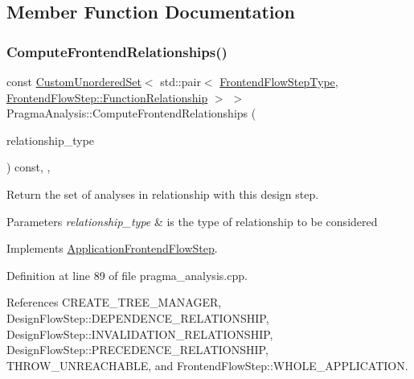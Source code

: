 \subsection{Member Function Documentation}
\mbox{\label{classPragmaAnalysis_a6c0e611acb6414cc71f044fc9ad2e715}} 
\subsubsection{\texorpdfstring{Compute\+Frontend\+Relationships()}{ComputeFrontendRelationships()}}
{\footnotesize\ttfamily const \hyperlink{classCustomUnorderedSet}{Custom\+Unordered\+Set}$<$ std\+::pair$<$ \hyperlink{frontend__flow__step_8hpp_afeb3716c693d2b2e4ed3e6d04c3b63bb}{Frontend\+Flow\+Step\+Type}, \hyperlink{classFrontendFlowStep_af7cf30f2023e5b99e637dc2058289ab0}{Frontend\+Flow\+Step\+::\+Function\+Relationship} $>$ $>$ Pragma\+Analysis\+::\+Compute\+Frontend\+Relationships (\begin{DoxyParamCaption}\item[{const \hyperlink{classDesignFlowStep_a723a3baf19ff2ceb77bc13e099d0b1b7}{Design\+Flow\+Step\+::\+Relationship\+Type}}]{relationship\+\_\+type }\end{DoxyParamCaption}) const\hspace{0.3cm}{\ttfamily [override]}, {\ttfamily [private]}, {\ttfamily [virtual]}}



Return the set of analyses in relationship with this design step. 


\begin{DoxyParams}{Parameters}
{\em relationship\+\_\+type} & is the type of relationship to be considered \\
\hline
\end{DoxyParams}


Implements \hyperlink{classApplicationFrontendFlowStep_ab308200c0096ccff3a1ff50e864ed61f}{Application\+Frontend\+Flow\+Step}.



Definition at line 89 of file pragma\+\_\+analysis.\+cpp.



References C\+R\+E\+A\+T\+E\+\_\+\+T\+R\+E\+E\+\_\+\+M\+A\+N\+A\+G\+ER, Design\+Flow\+Step\+::\+D\+E\+P\+E\+N\+D\+E\+N\+C\+E\+\_\+\+R\+E\+L\+A\+T\+I\+O\+N\+S\+H\+IP, Design\+Flow\+Step\+::\+I\+N\+V\+A\+L\+I\+D\+A\+T\+I\+O\+N\+\_\+\+R\+E\+L\+A\+T\+I\+O\+N\+S\+H\+IP, Design\+Flow\+Step\+::\+P\+R\+E\+C\+E\+D\+E\+N\+C\+E\+\_\+\+R\+E\+L\+A\+T\+I\+O\+N\+S\+H\+IP, T\+H\+R\+O\+W\+\_\+\+U\+N\+R\+E\+A\+C\+H\+A\+B\+LE, and Frontend\+Flow\+Step\+::\+W\+H\+O\+L\+E\+\_\+\+A\+P\+P\+L\+I\+C\+A\+T\+I\+ON.

